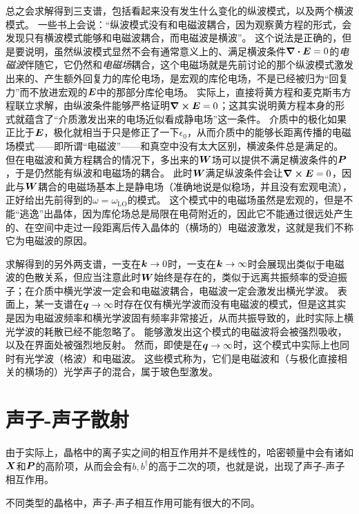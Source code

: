 总之会求解得到三支谱，包括看起来没有发生什么变化的纵波模式，以及两个横波模式。
一些书上会说：“纵波模式没有和电磁波耦合，因为观察黄方程的形式，会发现只有横波模式能够和电磁波耦合，而电磁波是横波”。
这个说法是正确的，但是要说明，虽然纵波模式显然不会有通常意义上的、满足横波条件$\div{\vb*{E}}=0$的\emph{电磁波}伴随它，它仍然和\emph{电磁场}耦合，这个电磁场就是先前讨论的那个纵波模式激发出来的、产生额外回复力的库伦电场，是宏观的库伦电场，不是已经被归为“回复力”而不放进宏观的$\vb*{E}$中的那部分库伦电场。
实际上，直接将黄方程和麦克斯韦方程联立求解，由纵波条件能够严格证明$\curl{\vb*{E}}=0$；这其实说明黄方程本身的形式就蕴含了“介质激发出来的电场近似看成静电场”这一条件。
介质中的极化如果正比于$\vb*{E}$，极化就相当于只是修正了一下$\epsilon_0$，从而介质中的能够长距离传播的电磁场模式——即所谓“电磁波”——和真空中没有太大区别，横波条件总是满足的。
但在电磁波和黄方程耦合的情况下，多出来的$\vb*{W}$场可以提供不满足横波条件的$\vb*{P}$，于是仍然能有纵波和电磁场的耦合。
此时$\vb*{W}$满足纵波条件会让$\curl{\vb*{E}}=0$，因此与$\vb*{W}$耦合的电磁场基本上是静电场（准确地说是似稳场，并且没有宏观电流），正好给出先前得到的$\omega=\omega_\text{LO}$的模式。
这个模式中的电磁场虽然是宏观的，但是不能“逃逸”出晶体，因为库伦场总是局限在电荷附近的，因此它不能通过很远处产生的、在空间中走过一段距离后传入晶体的（横场的）电磁波激发，这就是我们不称它为电磁波的原因。

求解得到的另外两支谱，一支在$\vb*{k} \to 0$时，一支在$\vb*{k} \to \infty$时会展现出类似于电磁波的色散关系，但应当注意此时$\vb*{W}$始终是存在的，类似于远离共振频率的受迫振子；在介质中横光学波一定会和电磁波耦合，电磁波一定会激发出横光学波。
表面上，某一支谱在$\vb*{q} \to \infty$时存在仅有横光学波而没有电磁波的模式，但是这其实是因为电磁波频率和横光学波固有频率非常接近，从而共振导致的，此时实际上横光学波的耗散已经不能忽略了。
能够激发出这个模式的电磁波将会被强烈吸收，以及在界面处被强烈地反射。
然而，即使是在$\vb*{q} \to \infty$时，这个模式中实际上也同时有光学波（格波）和电磁波。
这些模式称为，它们是电磁波和（与极化直接相关的横场的）光学声子的混合，属于玻色型激发。

\section{声子-声子散射}

由于实际上，晶格中的离子实之间的相互作用并不是线性的，哈密顿量中会有诸如$\vb*{X}$和$\vb*{P}$的高阶项，从而会会有${b}, {b}^\dagger$的高于二次的项，也就是说，出现了声子-声子相互作用。

不同类型的晶格中，声子-声子相互作用可能有很大的不同。

